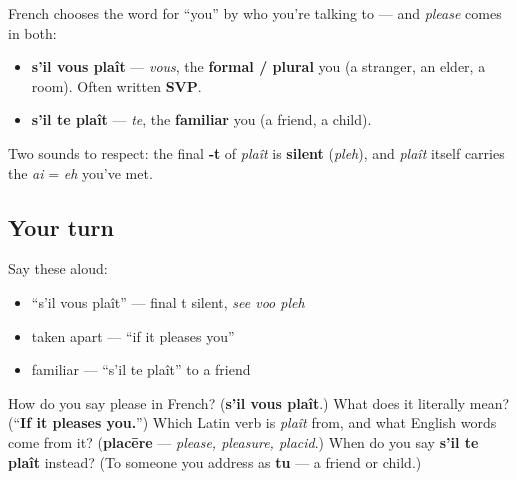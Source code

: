 \begin{grammarlens}[title={Grammar Lens: Formal and familiar}]
French chooses the word for \textquotedblleft{}you\textquotedblright{} by who you're talking to — and \emph{please} comes in both:

\begin{itemize}
\raggedright
  \item \textbf{s'il vous plaît} — \emph{vous}, the \textbf{formal / plural} you (a stranger, an elder, a room). Often written \textbf{SVP}.
  \item \textbf{s'il te plaît} — \emph{te}, the \textbf{familiar} you (a friend, a child).
\end{itemize}

Two sounds to respect: the final \textbf{‑t} of \emph{plaît} is \textbf{silent} (\emph{pleh}), and \emph{plaît} itself carries the \emph{ai} = \emph{eh} you've met.
\end{grammarlens}

\subsection*{Your turn}
Say these aloud:

\begin{itemize}
\raggedright
  \item \textquotedblleft{}s'il vous plaît\textquotedblright{} — final t silent, \emph{see voo pleh}
  \item taken apart — \textquotedblleft{}if it pleases you\textquotedblright{}
  \item familiar — \textquotedblleft{}s'il te plaît\textquotedblright{} to a friend
\end{itemize}

\begin{tcolorbox}[breakable,colback=teal!4,colframe=teal!35!black,title={Before you move on}]
How do you say please in French? (\textbf{s'il vous plaît}.) What does it literally mean? (\textquotedblleft{}\textbf{If it pleases you.}\textquotedblright{}) Which Latin verb is \emph{plaît} from, and what English words come from it? (\textbf{placēre} — \emph{please, pleasure, placid}.) When do you say \textbf{s'il te plaît} instead? (To someone you address as \textbf{tu} — a friend or child.)
\end{tcolorbox}
